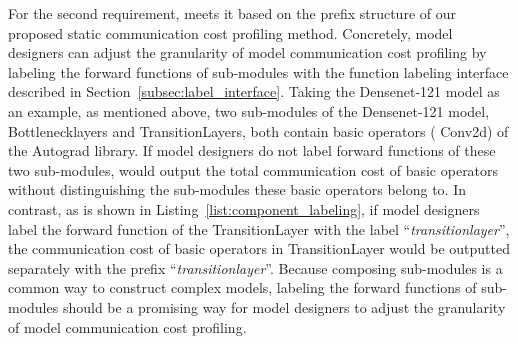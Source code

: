 For the second requirement, \hawkeye meets it based on the prefix structure of our proposed static communication cost profiling method. Concretely, model designers can adjust the granularity of model communication cost profiling by labeling the forward functions of sub-modules with the function labeling interface described in Section~\ref{subsec:label_interface}. Taking the Densenet-121 model as an example, as mentioned above, two sub-modules of the Densenet-121 model,  Bottlenecklayers and TransitionLayers, both contain basic operators ( Conv2d) of the \hawkeye Autograd library. If model designers do not label forward functions of these two sub-modules, \hawkeye would output the total communication cost of basic operators without distinguishing the sub-modules these basic operators belong to. In contrast, as is shown in Listing~\ref{list:component_labeling}, if model designers label the forward function of the TransitionLayer with the label ``\textit{transitionlayer}'', the communication cost of basic operators in TransitionLayer would be outputted separately with the prefix ``\textit{transitionlayer}''. Because composing sub-modules is a common way to construct complex models, labeling the forward functions of sub-modules should be a promising way for model designers to adjust the granularity of model communication cost profiling.


